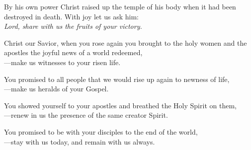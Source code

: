 \intercessions

\begin{raggedright}
By his own power Christ raised up the temple of his body when it had been destroyed in death. With joy let us ask him:\\
\emph{Lord, share with us the fruits of your victory.}

\medskip
Christ our Savior, when you rose again you brought to the holy women and the apostles the joyful news of a world redeemed,\\
{\color{red}---}make us witnesses to your risen life.

\medskip
You promised to all people that we would rise up again to newness of life,\\
{\color{red}---}make us heralds of your Gospel.

\medskip
You showed yourself to your apostles and breathed the Holy Spirit on them,\\
{\color{red}---}renew in us the presence of the same creator Spirit.

\medskip
You promised to be with your disciples to the end of the world,\\
{\color{red}---}stay with us today, and remain with us always.
\end{raggedright}